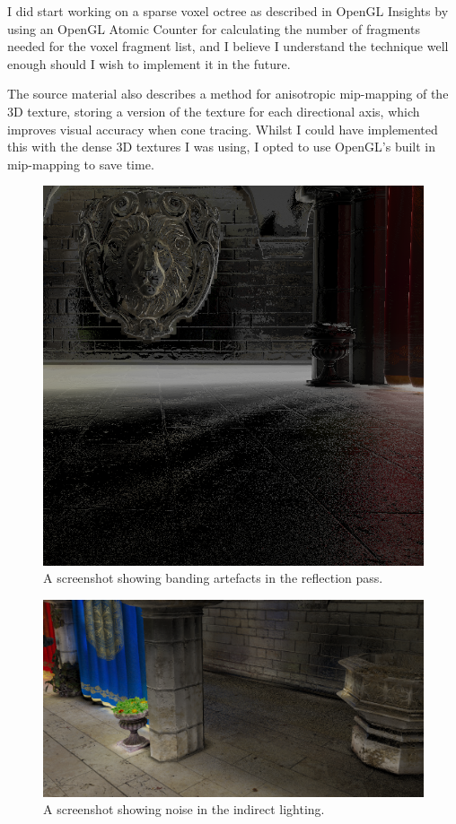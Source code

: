 \documentclass[]{acmsiggraph}
\begin{document}
I did start working on a sparse voxel octree as described in OpenGL Insights \cite{crassingreen2012} by using an OpenGL Atomic Counter for calculating the number of fragments needed for the voxel fragment list, and I believe I understand the technique well enough should I wish to implement it in the future.

The source material \cite{crassinneyretsainzgreeneisemann2011} also describes a method for anisotropic mip-mapping of the 3D texture, storing a version of the texture for each directional axis, which improves visual accuracy when cone tracing. Whilst I could have implemented this with the dense 3D textures I was using, I opted to use OpenGL's built in mip-mapping to save time.

\begin{figure}[htbp]\centering
 \includegraphics[width=1.0\linewidth]{images/banding.png}
 \caption{A screenshot showing banding artefacts in the reflection pass.}
\end{figure}

\begin{figure}[htbp]\centering
 \includegraphics[width=1.0\linewidth]{images/indirect_noise.png}
 \caption{A screenshot showing noise in the indirect lighting.}
\end{figure}
\end{document}
